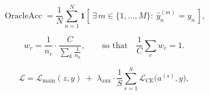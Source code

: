 \documentclass[11pt]{article}
\begin{document}
\begin{equation}
\operatorname{OracleAcc} = \frac{1}{N}\sum_{n=1}^{N}
  \mathbf{1}\!\left[\,\exists\, m\in\{1,\dots,M\}:\ \widehat{y}^{(m)}_n = y_n\,\right],
\end{equation}


\begin{equation}
w_c = \frac{1}{n_c}\cdot\frac{C}{\sum_{k} \frac{1}{n_k}},
\qquad\text{so that}\quad \frac{1}{C}\sum_c w_c = 1 .
\end{equation}

\begin{equation}
\mathcal{L} = \mathcal{L}_{\text{main}}(z,y) \;+\; \lambda_{\text{aux}}\cdot\frac{1}{S}\sum_{s=1}^{S}
              \mathcal{L}_{\text{CE}}\!\bigl(a^{(s)},y\bigr),
\end{equation}
\end{document}
